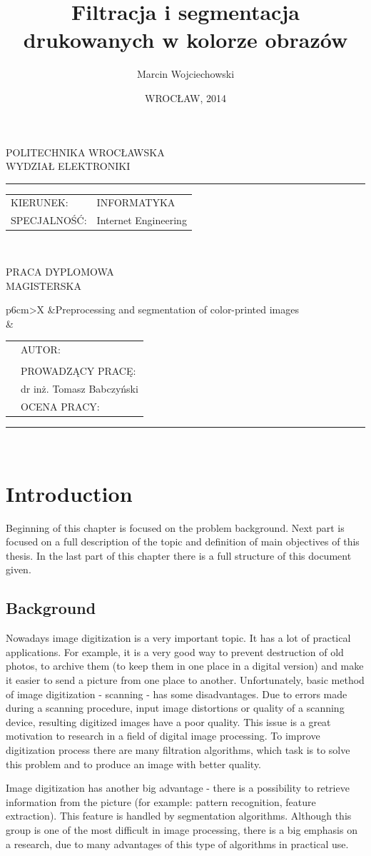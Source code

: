 \documentclass[a4paper,onecolumn,oneside,12pt]{memoir}
\makeatletter
\newcommand\uczelnia[1]{\renewcommand\@uczelnia{#1}}
\newcommand\@uczelnia{}
\newcommand\wydzial[1]{\renewcommand\@wydzial{#1}}
\newcommand\@wydzial{}
\newcommand\kierunek[1]{\renewcommand\@kierunek{#1}}
\newcommand\@kierunek{}
\newcommand\specjalnosc[1]{\renewcommand\@specjalnosc{#1}}
\newcommand\@specjalnosc{}
\newcommand\titleEN[1]{\renewcommand\@titleEN{#1}}
\newcommand\@titleEN{}
\newcommand\titleShort[1]{\renewcommand\@titleShort{#1}}
\newcommand\@titleShort{}
\newcommand\promotor[1]{\renewcommand\@promotor{#1}}
\newcommand\@promotor{}
\def\maketitle{%
  \null
  \pagestyle{empty}%
	{\centering\vspace{-1cm}
		{\fontsize{22pt}{24pt}\selectfont \@uczelnia}\\[0.4cm]
		{\fontsize{22pt}{24pt}\selectfont \@wydzial }\\[0.5cm]
		\hrule \vspace*{0.7cm}
	}
{\flushleft\fontsize{14pt}{16pt}\selectfont%
\begin{tabular}{ll}
KIERUNEK: & \@kierunek\\
SPECJALNOŚĆ: & \@specjalnosc\\
\end{tabular}\\[1.3cm]
}
{\centering
\vskip 1cm
{\fontsize{24pt}{26pt}\selectfont PRACA DYPLOMOWA}\\[0.5cm]
{\fontsize{24pt}{26pt}\selectfont MAGISTERSKA}\\[2cm]
\vskip 0.8cm
}
%
\begin{tabularx}{\linewidth}{p{6cm}>{\centering\arraybackslash}X}
		&{\fontsize{16pt}{18pt}\selectfont \@titleEN}\\[5mm] 	%
		&{\fontsize{16pt}{18pt}\selectfont \@title}\\[10mm] %
\end{tabularx}
\vfill
\begin{tabularx}{\linewidth}{p{6cm}l}
		&{\fontsize{16pt}{18pt}\selectfont AUTOR:}\\[5mm]
		&{\fontsize{14pt}{16pt}\selectfont \@author}\\[10mm]
		&{\fontsize{16pt}{18pt}\selectfont PROWADZĄCY PRACĘ:}\\[5mm]
		&{\fontsize{14pt}{16pt}\selectfont \@promotor}\\[10mm]
		&{\fontsize{16pt}{18pt}\selectfont OCENA PRACY:}\\[20mm]
	\end{tabularx}
\hrule\vspace*{0.3cm}
{\centering
{\fontsize{16pt}{18pt}\selectfont \@date}\\[0cm]
}
\normalfont
 \cleardoublepage
}
\makeatother
\begin{document}
\title{Filtracja i segmentacja drukowanych w kolorze obrazów}
\titleShort{Filtracja i segmentacja drukowanych w kolorze obrazów}
\titleEN{Preprocessing and segmentation of color-printed images}
\author{Marcin Wojciechowski}
\uczelnia{POLITECHNIKA WROCŁAWSKA}
\wydzial{WYDZIAŁ ELEKTRONIKI}
\kierunek{INFORMATYKA}
\specjalnosc{Internet Engineering}
\promotor{dr inż. Tomasz Babczyński}
\date{WROCŁAW, 2014}
\maketitle

\pagestyle{outer}
\mbox{}
\tableofcontents* 
\newpage

\chapter{Introduction}

Beginning of this chapter is focused on the problem background. Next part is focused on a 
full description of the topic and definition of main objectives of this thesis.
In the last part of this chapter there is a full structure of this document given.

\section{Background}

Nowadays image digitization is a very important topic. It has a lot of practical applications.
For example, it is a very good way to prevent destruction of old photos,
to archive them (to keep them in one place in a digital version) and make it easier to 
send a picture from one place to another. Unfortunately, basic method of image digitization - 
scanning - has some disadvantages. Due to errors made during a scanning procedure,
input image distortions or quality of a scanning device, resulting digitized images 
have a poor quality. This issue is a great motivation to research in a field of digital image
processing. To improve digitization process there are many filtration algorithms,
which task is to solve this problem and to produce an image with better quality.

Image digitization has another big advantage - there is a possibility to retrieve information from
the picture (for example: pattern recognition, feature extraction). This feature is handled by
segmentation algorithms. Although this group is one of the most difficult in image processing, there
is a big emphasis on a research, due to many advantages of this type of algorithms in practical
use. \\
\end{document}
